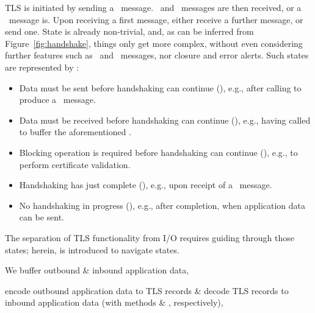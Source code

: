 TLS is initiated by sending a \ClientHello\ message. 
\ServerHello\ and \EncryptedExtensions\ messages are then received,
or a \HelloRetryRequest\ message is. 
Upon receiving a first message, either receive a further message, or send one. 
State is already non-trivial, and, as can be inferred from Figure~\ref{fig:handshake}, 
things only get more complex, without even considering further features 
such as \NewSessionTicket\ and \KeyUpdate\ messages, nor closure and error alerts.
Such states are represented by : 
%
\begin{itemize}
\item
  Data must be sent before handshaking can continue (), 
  e.g., after calling  to produce a \ClientHello\ message.
\item
  Data must be received before handshaking can continue (), 
  e.g., having called  to buffer the aforementioned \ClientHello.
\item
  Blocking operation is required before handshaking can continue (),
  e.g., to perform certificate validation.
\item
  Handshaking has just complete (), 
  e.g., upon receipt of a \Finished\ message.
\item
  No handshaking in progress (),
  e.g., after completion, when application data can be sent.
\end{itemize}
%
The separation of TLS functionality from I/O requires guiding  through those states;
herein,  is introduced to navigate states.

\lstset{widthgobble=0*0} 



\noindent
We buffer outbound \& inbound application data,



\noindent
encode outbound application data to TLS records 
\& decode TLS records to inbound application data 
(with methods  \& , respectively),




